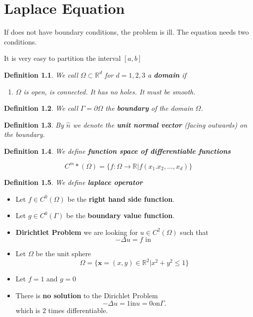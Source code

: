 \documentclass[openany]{memoir}
\theoremstyle{defintion}
\newtheorem{definition}{Definition}
\begin{document}
\chapter{Laplace Equation}

If does not have boundary conditions, the problem is ill. The equation needs two conditions.

It is very easy to partition the interval $[a,b]$


\begin{definition}
  We call $\Omega\subset\mathbb{R}^d$ for $d=1,2,3$ a \textbf{domain} if

  \begin{enumerate}
  \item $\Omega$ is open, is connected. It has no holes. It must be smooth.
    \end{enumerate}
\end{definition}

\begin{definition}
  We call $\Gamma=\partial\Omega$ the \textbf{boundary} of the domain $\Omega$.
\end{definition}

\begin{definition}
By $\hat{n}$ we denote the \textbf{unit normal vector} (facing outwards) on the boundary.
\end{definition}

\begin{definition}
  We define \textbf{function space of differentiable functions}

  \[ C^m*(\Omega)=\{f\colon\Omega\rightarrow\mathbb{R}|f(x_1.x_2,\ldots, x_d) \} \]
\end{definition}

\begin{definition}
We define \textbf{laplace operator}
\end{definition}


\begin{itemize}
\item Let $f\in C^{0}(\Omega)$ be the \textbf{right hand side function}.
\item Let $g\in C^0(\Gamma)$ be the \textbf{boundary value function}.
 
\item \textbf{Dirichtlet Problem} we are looking for $u\in C^2(\Omega)$ such that
  \[ -\Delta u=f\text{ in } \]

\item Let $\Omega$ be the unit sphere
  \[ \Omega=\{\bm{x}=(x,y)\in\mathbb{R}^2|x^2+y^2\le 1 \} \]

\item Let $f=1$ and $g=0$
\item There is \textbf{no solution} to the Dirichlet Problem \[-\Delta u=1 \text{in} u=0 \text{on}\Gamma. \] which is $2$ times differentiable.
\end{itemize}
\end{document}
